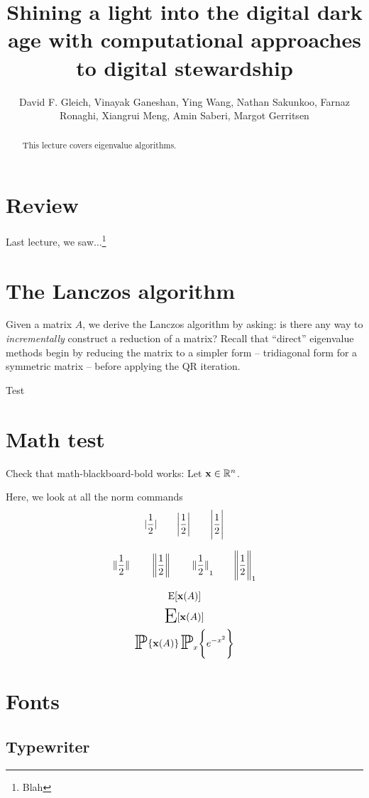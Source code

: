 \documentclass[longtitle,sidenotes,nofancyfonts]{dgleich-article}
\title{Shining a light into the digital dark age with computational approaches to digital stewardship}
\author{David F. Gleich, Vinayak Ganeshan, Ying Wang, Nathan Sakunkoo, Farnaz Ronaghi, Xiangrui Meng, Amin Saberi, Margot Gerritsen}
\begin{document}

 \maketitle

\begin{abstract}
 This lecture covers eigenvalue algorithms.
\end{abstract}

\section{Review}
Last lecture, we saw...\footnote{Blah}

\section{The Lanczos algorithm}
Given a matrix $A$, we derive the Lanczos algorithm by asking:
is there any way to \emph{incrementally} construct a reduction
of a matrix?
Recall that ``direct'' eigenvalue methods begin by reducing
the matrix to a simpler form -- tridiagonal form for a
symmetric matrix -- before applying the QR iteration.

\begin{theorem}%
 Test
\end{theorem}

\section{Math test}
Check that math-blackboard-bold works:
Let $\boldsymbol{\mathrm{x}} \in \mathbb{R}^n$.

Here, we look at all the norm commands
\[
 \absof{\frac{1}{2}} \qquad \absof*{\frac{1}{2}} \qquad \absof[\Bigg]{\frac{1}{2}}
\]

\[
 \normof{\frac{1}{2}} \qquad \normof*{\frac{1}{2}}
 \qquad \normof[1]{\frac{1}{2}} 
 \qquad \normof[1][\Bigg]{\frac{1}{2}} 
\]

\[ \operatorname{E}[\boldsymbol{\mathrm{x}}(A)] \]
\[ \hugeEof{\vx(A)} \]
\[ \hugeprob{\vx(A)} \hugeprob[x][\Bigg]{e^{-x^2}} \]

\section{Fonts}

\subsection{Typewriter}
\end{document}
